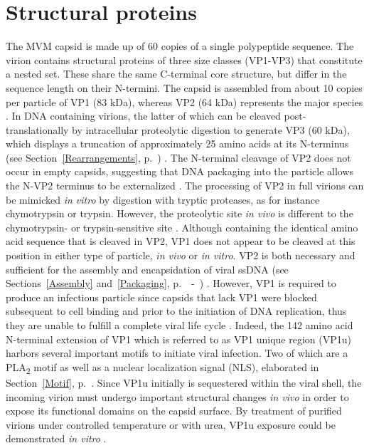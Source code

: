 \section{Structural proteins}
\label{VPs}

The MVM capsid is made up of 60 copies of a single polypeptide sequence. The virion contains structural proteins of three size classes (VP1-VP3) that constitute a nested set. These share the same C-terminal core structure, but differ in the sequence length on their N-termini. The capsid is assembled from about 10 copies per particle of VP1 (83 kDa), whereas VP2 (64 kDa) represents the major species \cite{pmid988192}. In DNA containing virions, the latter of which can be cleaved post-translationally by intracellular proteolytic digestion to generate VP3 (60 kDa), which displays a truncation of approximately 25 amino acids at its N-terminus (see Section~\ref{Rearrangements}, p.~\pageref{Rearrangements}) \cite{pmid864702, pmid1448928, pmid982825, pmid9770425}. The N-terminal cleavage of VP2 does not occur in empty capsids, suggesting that DNA packaging into the particle allows the N-VP2 terminus to be externalized \cite{pmid3296697, pmid6481856, pmid864702}. The processing of VP2 in full virions can be mimicked \textit{in vitro} by digestion with tryptic proteases, as for instance chymotrypsin or trypsin. However, the proteolytic site \textit{in vivo} is different to the chymotrypsin- or trypsin-sensitive site \cite{pmid6481856, pmid864702, pmid1448928}. Although containing the identical amino acid sequence that is cleaved in VP2, VP1 does not appear to be cleaved at this position in either type of particle, \textit{in vivo} or \textit{in vitro}. VP2 is both necessary and sufficient for the assembly and encapsidation of viral ssDNA (see Sections~\ref{Assembly} and~\ref{Packaging}, p.~\pageref{Assembly}~-~\pageref{Packaging}) \cite{pmid10662625}. However, VP1 is required to produce an infectious particle since capsids that lack VP1 were blocked subsequent to cell binding and prior to the initiation of DNA replication, thus they are unable to fulfill a complete viral life cycle \cite{pmid8416366}. Indeed, the 142 amino acid N-terminal extension of VP1 which is referred to as VP1 unique region (VP1u) harbors several important motifs to initiate viral infection. Two of which are a PLA\textsubscript{2} motif as well as a nuclear localization signal (NLS), elaborated in Section~\ref{Motif}, p.~\pageref{Motif}. Since VP1u initially is sequestered within the viral shell, the incoming virion must undergo important structural changes \textit{in vivo} in order to expose its functional domains on the capsid surface. By treatment of purified virions under controlled temperature or with urea, VP1u exposure could be demonstrated \textit{in vitro} \cite{pmid9927584, pmid15194745}. 
    
